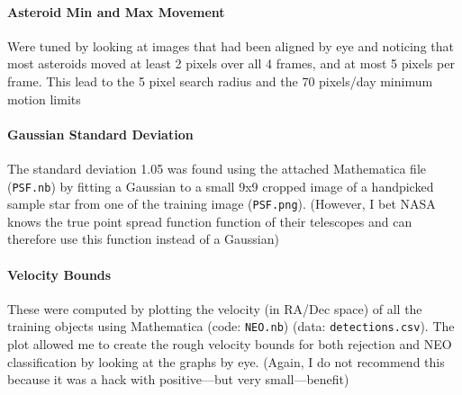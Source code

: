 \documentclass[letterpaper,options]{article}
\begin{document}
\paragraph{Asteroid Min and Max Movement} Were tuned by looking at images that had been aligned by eye and noticing that most asteroids moved at least 2 pixels over all 4 frames, and at most 5 pixels per frame. This lead to the 5 pixel search radius and the 70 pixels/day minimum motion limits
\paragraph{Gaussian Standard Deviation} The standard deviation 1.05 was found using the attached Mathematica file (\texttt{PSF.nb}) by fitting a Gaussian to a small 9x9 cropped image of a handpicked sample star from one of the training image (\texttt{PSF.png}). (However, I bet NASA knows the true point spread function function of their telescopes and can therefore use this function instead of a Gaussian)
\paragraph{Velocity Bounds}
These were computed by plotting the velocity (in RA/Dec space) of all the training objects using Mathematica (code: \texttt{NEO.nb}) (data: \texttt{detections.csv}). The plot allowed me to create the rough velocity bounds for both rejection and NEO classification by looking at the graphs by eye. (Again, I do not recommend this because it was a hack with positive---but very small---benefit)
\end{document}
